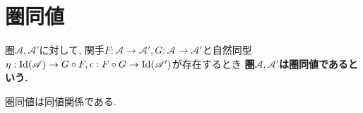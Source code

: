 \section{圏同値}
\begin{Def}
圏$\mathscr{A},\mathscr{A}'$に対して, 関手$F:\mathscr{A}\rightarrow\mathscr{A}', G:\mathscr{A}\rightarrow\mathscr{A}'$と自然同型$\eta:\mathrm{Id}(\mathscr{A})\rightarrow G\circ F,\epsilon:F\circ G\rightarrow\rm{Id}(\mathscr{A}')$が存在するとき
\bf{圏$\mathscr{A},\mathscr{A}'$は圏同値である}という.
\end{Def}
\begin{Prop}
圏同値は同値関係である.
\end{Prop}

\begin{comment}
\section{Haskにおける自然同型}
\subsection{mirror関数}
Tree関手からTree関手への自然同型
\subsection{Maybe関手とEither()関手の間の自然同型}
\section{まとめ}
aa
\end{comment}